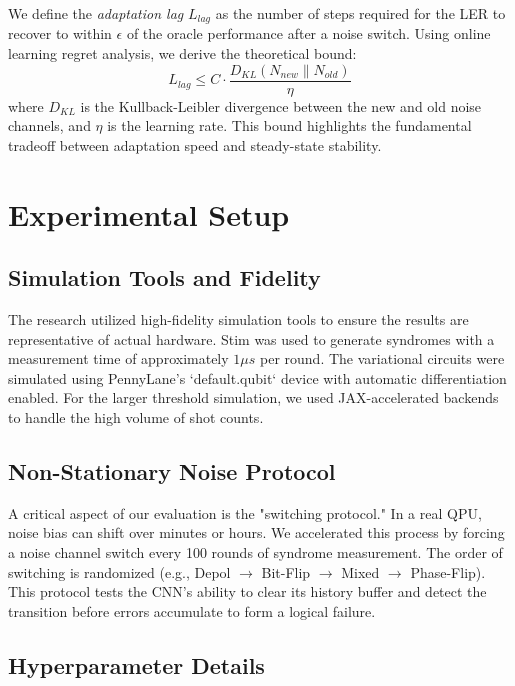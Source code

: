 \documentclass[journal,twocolumn]{IEEEtran}
\begin{document}
We define the \textit{adaptation lag} $L_{lag}$ as the number of steps required for the LER to recover to within $\epsilon$ of the oracle performance after a noise switch. Using online learning regret analysis, we derive the theoretical bound:
\begin{equation}
    L_{lag} \leq C \cdot \frac{D_{KL}(N_{new} \| N_{old})}{\eta}
\end{equation}
where $D_{KL}$ is the Kullback-Leibler divergence between the new and old noise channels, and $\eta$ is the learning rate. This bound highlights the fundamental tradeoff between adaptation speed and steady-state stability.


\section{Experimental Setup}

\subsection{Simulation Tools and Fidelity}

The research utilized high-fidelity simulation tools to ensure the results are representative of actual hardware. Stim \cite{gidney2021stim} was used to generate syndromes with a measurement time of approximately $1 \mu s$ per round. The variational circuits were simulated using PennyLane's \cite{bergholm2018pennylane} `default.qubit` device with automatic differentiation enabled. For the larger threshold simulation, we used JAX-accelerated backends to handle the high volume of shot counts.

\subsection{Non-Stationary Noise Protocol}

A critical aspect of our evaluation is the "switching protocol." In a real QPU, noise bias can shift over minutes or hours. We accelerated this process by forcing a noise channel switch every 100 rounds of syndrome measurement. The order of switching is randomized (e.g., Depol $\rightarrow$ Bit-Flip $\rightarrow$ Mixed $\rightarrow$ Phase-Flip). This protocol tests the CNN's ability to clear its history buffer and detect the transition before errors accumulate to form a logical failure.

\subsection{Hyperparameter Details}
\end{document}
